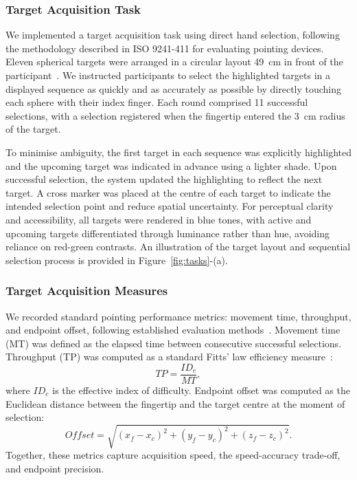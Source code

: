 \subsubsection{Target Acquisition Task}
We implemented a target acquisition task using direct hand selection, following the methodology described in ISO 9241-411 for evaluating pointing devices. Eleven spherical targets were arranged in a circular layout 49~cm in front of the participant~\citep{li2025weight}. We instructed participants to select the highlighted targets in a displayed sequence as quickly and as accurately as possible by directly touching each sphere with their index finger. Each round comprised 11 successful selections, with a selection registered when the fingertip entered the 3~cm radius of the target.

To minimise ambiguity, the first target in each sequence was explicitly highlighted and the upcoming target was indicated in advance using a lighter shade. Upon successful selection, the system updated the highlighting to reflect the next target. A cross marker was placed at the centre of each target to indicate the intended selection point and reduce spatial uncertainty. For perceptual clarity and accessibility, all targets were rendered in blue tones, with active and upcoming targets differentiated through luminance rather than hue, avoiding reliance on red-green contrasts. An illustration of the target layout and sequential selection process is provided in Figure~\ref{fig:tasks}-(a).

\subsubsection{Target Acquisition Measures}
We recorded standard pointing performance metrics: movement time, throughput, and endpoint offset, following established evaluation methods~\citep{liu2025understanding}. Movement time (MT) was defined as the elapsed time between consecutive successful selections. Throughput (TP) was computed as a standard Fitts' law efficiency measure~\citep{mackenzie2008fitts,wobbrock2011effects}:
\[
TP = \frac{ID_e}{MT},
\]
where $ID_e$ is the effective index of difficulty. Endpoint offset was computed as the Euclidean distance between the fingertip and the target centre at the moment of selection:
\[
Offset = \sqrt{(x_f-x_c)^2 + (y_f-y_c)^2 + (z_f-z_c)^2}.
\]
Together, these metrics capture acquisition speed, the speed-accuracy trade-off, and endpoint precision.

